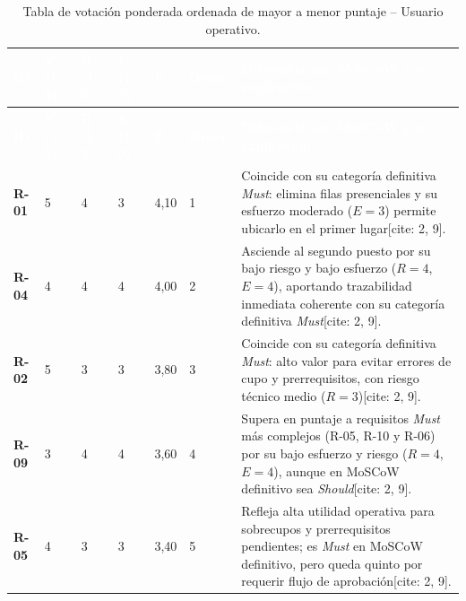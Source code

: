 \documentclass[12pt,a4paper]{article}
\newcommand{\cabecera}[1]{
    \textcolor{white}{\textbf{#1}}
}
\begin{document}
\begingroup

\small
\singlespacing
\setlength{\tabcolsep}{4pt}

\begin{longtable}{
    C{1.1cm}
    C{1.1cm}
    C{1.1cm}
    C{1.1cm}
    C{1.2cm}
    C{1.2cm}
    L{6.8cm}
}

\caption{Tabla de votación ponderada ordenada de mayor a menor puntaje -- Usuario operativo.}
\label{tab:votacion}\\

\cabecera{ID} &
\cabecera{V (1--5)} &
\cabecera{R (1--5)} &
\cabecera{E (1--5)} &
\cabecera{P} &
\cabecera{Orden} &
\cabecera{Diferencia con MoSCoW y su explicación} \\

\endfirsthead

\cabecera{ID} &
\cabecera{V (1--5)} &
\cabecera{R (1--5)} &
\cabecera{E (1--5)} &
\cabecera{P} &
\cabecera{Orden} &
\cabecera{Diferencia con MoSCoW y su explicación} \\

\endhead

\bottomrule

\endfoot

\textbf{R-01} & 5 & 4 & 3 & 4{,}10 & 1 &
Coincide con su categoría definitiva \textit{Must}: elimina filas presenciales y su esfuerzo moderado ($E=3$) permite ubicarlo en el primer lugar[cite: 2, 9]. \\

\textbf{R-04} & 4 & 4 & 4 & 4{,}00 & 2 &
Asciende al segundo puesto por su bajo riesgo y bajo esfuerzo ($R=4$, $E=4$), aportando trazabilidad inmediata coherente con su categoría definitiva \textit{Must}[cite: 2, 9]. \\

\textbf{R-02} & 5 & 3 & 3 & 3{,}80 & 3 &
Coincide con su categoría definitiva \textit{Must}: alto valor para evitar errores de cupo y prerrequisitos, con riesgo técnico medio ($R=3$)[cite: 2, 9]. \\

\textbf{R-09} & 3 & 4 & 4 & 3{,}60 & 4 &
Supera en puntaje a requisitos \textit{Must} más complejos (R-05, R-10 y R-06) por su bajo esfuerzo y riesgo ($R=4$, $E=4$), aunque en MoSCoW definitivo sea \textit{Should}[cite: 2, 9]. \\

\textbf{R-05} & 4 & 3 & 3 & 3{,}40 & 5 &
Refleja alta utilidad operativa para sobrecupos y prerrequisitos pendientes; es \textit{Must} en MoSCoW definitivo, pero queda quinto por requerir flujo de aprobación[cite: 2, 9]. \\


\end{longtable}
\end{document}
